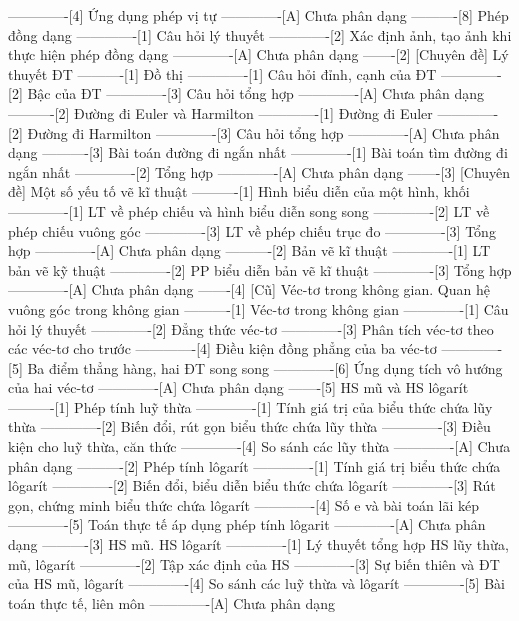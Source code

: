 -------------[4] Ứng dụng phép vị tự
-------------[A] Chưa phân dạng
----------[8] Phép đồng dạng
-------------[1] Câu hỏi lý thuyết
-------------[2] Xác định ảnh, tạo ảnh khi thực hiện phép đồng dạng
-------------[A] Chưa phân dạng
-------[2] [Chuyên đề] Lý thuyết ĐT
----------[1] Đồ thị
-------------[1] Câu hỏi đỉnh, cạnh của ĐT
-------------[2] Bậc của ĐT
-------------[3] Câu hỏi tổng hợp
-------------[A] Chưa phân dạng
----------[2] Đường đi Euler và Harmilton
-------------[1] Đường đi Euler
-------------[2] Đường đi Harmilton
-------------[3] Câu hỏi tổng hợp
-------------[A] Chưa phân dạng
----------[3] Bài toán đường đi ngắn nhất
-------------[1] Bài toán tìm đường đi ngắn nhất
-------------[2] Tổng hợp
-------------[A] Chưa phân dạng
-------[3] [Chuyên đề] Một số yếu tố vẽ kĩ thuật
----------[1] Hình biểu diễn của một hình, khối
-------------[1] LT về phép chiếu và hình biểu diễn song song
-------------[2] LT về phép chiếu vuông góc
-------------[3] LT về phép chiếu trục đo
-------------[3] Tổng hợp
-------------[A] Chưa phân dạng
----------[2] Bản vẽ kĩ thuật
-------------[1] LT bản vẽ kỹ thuật
-------------[2] PP biểu diễn bản vẽ kĩ thuật
-------------[3] Tổng hợp
-------------[A] Chưa phân dạng
-------[4] [Cũ] Véc-tơ trong không gian. Quan hệ vuông góc trong không gian
----------[1] Véc-tơ trong không gian
-------------[1] Câu hỏi lý thuyết
-------------[2] Đẳng thức véc-tơ
-------------[3] Phân tích véc-tơ theo các véc-tơ cho trước
-------------[4] Điều kiện đồng phẳng của ba véc-tơ
-------------[5] Ba điểm thẳng hàng, hai ĐT song song
-------------[6] Ứng dụng tích vô hướng của hai véc-tơ
-------------[A] Chưa phân dạng
-------[5] HS mũ và HS lôgarít
----------[1] Phép tính luỹ thừa
-------------[1] Tính giá trị của biểu thức chứa lũy thừa
-------------[2] Biến đổi, rút gọn biểu thức chứa lũy thừa
-------------[3] Điều kiện cho luỹ thừa, căn thức
-------------[4] So sánh các lũy thừa
-------------[A] Chưa phân dạng
----------[2] Phép tính lôgarít
-------------[1] Tính giá trị biểu thức chứa lôgarít
-------------[2] Biến đổi, biểu diễn biểu thức chứa lôgarít
-------------[3] Rút gọn, chứng minh biểu thức chứa lôgarít
-------------[4] Số e và bài toán lãi kép
-------------[5] Toán thực tế áp dụng phép tính lôgarit
-------------[A] Chưa phân dạng
----------[3] HS mũ. HS lôgarít
-------------[1] Lý thuyết tổng hợp HS lũy thừa, mũ, lôgarít
-------------[2] Tập xác định của HS
-------------[3] Sự biến thiên và ĐT của HS mũ, lôgarít
-------------[4] So sánh các luỹ thừa và lôgarít
-------------[5] Bài toán thực tế, liên môn
-------------[A] Chưa phân dạng
